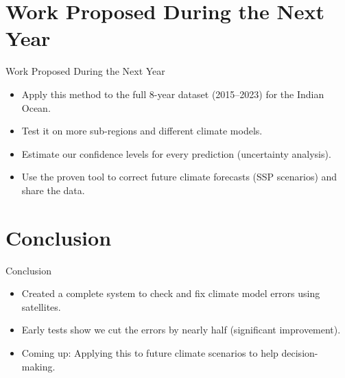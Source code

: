 \documentclass[aspectratio=169]{beamer}
\newcommand{\footerdetails}{}
\newcommand{\setfooter}[1]{\renewcommand{\footerdetails}{#1}}
\begin{document}
\section{Work Proposed During the Next Year}
\begin{frame}{Work Proposed During the Next Year}
  \setfooter{Future milestones: Extending dataset and uncertainty analysis}
  \begin{itemize}
    \item Apply this method to the full 8-year dataset (2015--2023) for the Indian Ocean.
    \item Test it on more sub-regions and different climate models.
    \item Estimate our confidence levels for every prediction (uncertainty analysis).
    \item Use the proven tool to correct future climate forecasts (SSP scenarios) and share the data.
  \end{itemize}
\end{frame}

\section{Conclusion}
\begin{frame}{Conclusion}
  \setfooter{Project summary and key takeaways from initial research}
  \begin{itemize}
    \item Created a complete system to check and fix climate model errors using satellites.
    \item Early tests show we cut the errors by nearly half (significant improvement).
    \item Coming up: Applying this to future climate scenarios to help decision-making.
  \end{itemize}
\end{frame}
\end{document}
